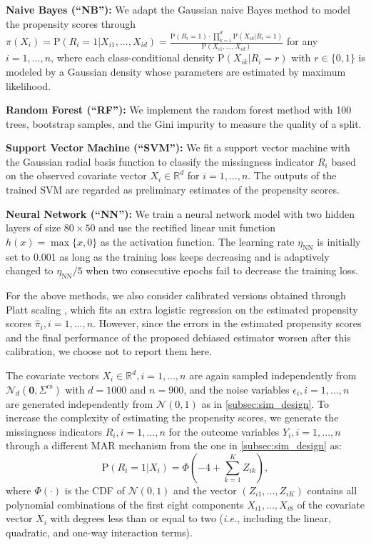 \documentclass[ejsv2,noshowframe]{imsart}
\theoremstyle{plain}
\theoremstyle{definition}
\theoremstyle{remark}
\renewcommand{\hat}{\widehat}
\begin{document}
{\bf Naive Bayes (``NB''):} We adapt the Gaussian naive Bayes method \citep{zhang2004} to model the propensity scores through $\pi(X_i)=\mathrm{P}(R_i=1|X_{i1},...,X_{id}) = \frac{\mathrm{P}(R_i=1) \cdot \prod_{k=1}^d \mathrm{P}(X_{ik}|R_i=1)}{\mathrm{P}(X_{i1},...,X_{id})}$ for any $i=1,...,n$, where each class-conditional density $\mathrm{P}(X_{ik}|R_i=r)$ with $r\in\{0,1\}$ is modeled by a Gaussian density whose parameters are estimated by maximum likelihood.

{\bf Random Forest (``RF''):} We implement the random forest method \citep{breiman2001random} with 100 trees, bootstrap samples, and the Gini impurity to measure the quality of a split.

{\bf Support Vector Machine (``SVM''):} We fit a support vector machine \citep{chen2005tutorial} with the Gaussian radial basis function to classify the missingness indicator $R_i$ based on the observed covariate vector $X_i\in \mathbb{R}^d$ for $i=1,...,n$. The outputs of the trained SVM are regarded as preliminary estimates of the propensity scores.

{\bf Neural Network (``NN''):} We train a neural network model with two hidden layers of size $80\times 50$ and use the rectified linear unit function $h(x)=\max\{x,0\}$ as the activation function. The learning rate $\eta_{\text{NN}}$ is initially set to $0.001$ as long as the training loss keeps decreasing and is adaptively changed to $\eta_{\text{NN}}/5$ when two consecutive epochs fail to decrease the training loss.

For the above methods, we also consider calibrated versions obtained through Platt scaling \citep{platt1999probabilistic}, which fits an extra logistic regression on the estimated propensity scores $\hat{\pi}_i,i=1,...,n$. However, since the errors in the estimated propensity scores and the final performance of the proposed debiased estimator worsen after this calibration, we choose not to report them here.

The covariate vectors $X_i \in \mathbb{R}^d,i=1,...,n$ are again sampled independently from $\mathcal{N}_d(\bm{0}, \Sigma^{\mathrm{cs}})$ with $d=1000$ and $n=900$, and the noise variables $\epsilon_i,i=1,...,n$ are generated independently from $\mathcal{N}(0,1)$ as in \autoref{subsec:sim_design}. To increase the complexity of estimating the propensity scores, we generate the missingness indicators $R_i,i=1,...,n$ for the outcome variables $Y_i,i=1,...,n$ through a different MAR mechanism from the one in \autoref{subsec:sim_design} as:
\begin{equation}
	\label{MAR_mis}
	\mathrm{P}(R_i=1|X_i) = \Phi\left(-4+\sum_{k=1}^K Z_{ik} \right),
\end{equation}
where $\Phi(\cdot)$ is the CDF of $\mathcal{N}(0,1)$ and the vector $(Z_{i1},...,Z_{iK})$ contains all polynomial combinations of the first eight components $X_{i1},...,X_{i8}$ of the covariate vector $X_i$ with degrees less than or equal to two (\emph{i.e.}, including the linear, quadratic, and one-way interaction terms).
\end{document}
